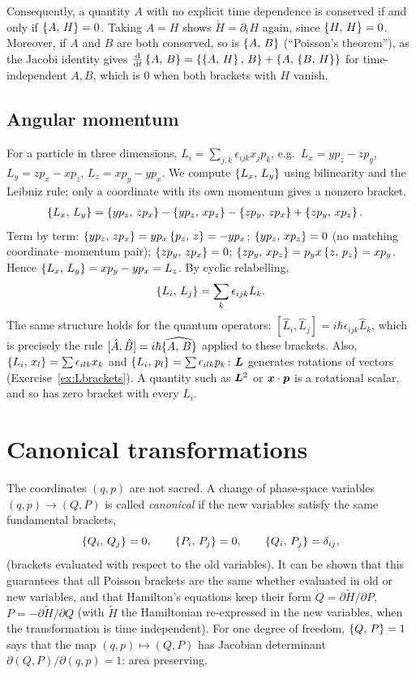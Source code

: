\documentclass[11pt]{article}
\begin{document}
Consequently, a quantity $A$ with no explicit time dependence is conserved if and only if $\left\{A,\,H\right\}=0$. Taking $A=H$ shows $\dot H=\partial_tH$ again, since $\left\{H,\,H\right\}=0$. Moreover, if $A$ and $B$ are both conserved, so is $\left\{A,\,B\right\}$ (``Poisson's theorem''), as the Jacobi identity gives $\frac{\mathrm{d} }{\mathrm{d} t}\left\{A,\,B\right\}=\left\{\left\{A,\,H\right\},\,B\right\}+\left\{A,\,\left\{B,\,H\right\}\right\}$ for time-independent $A,B$, which is $0$ when both brackets with $H$ vanish.

\subsection{Angular momentum}

For a particle in three dimensions, $L_i=\sum_{j,k}\epsilon_{ijk}x_jp_k$, e.g.\ $L_x=yp_z-zp_y$, $L_y=zp_x-xp_z$, $L_z=xp_y-yp_x$. We compute $\left\{L_x,\,L_y\right\}$ using bilinearity and the Leibniz rule; only a coordinate with its own momentum gives a nonzero bracket.
\begin{align}
 \left\{L_x,\,L_y\right\}&=\left\{yp_z,\,zp_x\right\}-\left\{yp_z,\,xp_z\right\}-\left\{zp_y,\,zp_x\right\}+\left\{zp_y,\,xp_z\right\}.
\end{align}
Term by term: $\left\{yp_z,\,zp_x\right\}=yp_x\left\{p_z,\,z\right\}=-yp_x$; $\left\{yp_z,\,xp_z\right\}=0$ (no matching coordinate--momentum pair); $\left\{zp_y,\,zp_x\right\}=0$; $\left\{zp_y,\,xp_z\right\}=p_yx\left\{z,\,p_z\right\}=xp_y$. Hence $\left\{L_x,\,L_y\right\}=xp_y-yp_x=L_z$. By cyclic relabelling,
\begin{equation}
 \left\{L_i,\,L_j\right\}=\sum_k\epsilon_{ijk}L_k .
\end{equation}
The same structure holds for the quantum operators: $[\hat L_i,\hat L_j]=i\hbar\epsilon_{ijk}\hat L_k$, which is precisely the rule $[\hat A,\hat B]=i\hbar\widehat{\left\{A,\,B\right\}}$ applied to these brackets. Also, $\left\{L_i,\,x_l\right\}=\sum\epsilon_{ilk}x_k$ and $\left\{L_i,\,p_l\right\}=\sum\epsilon_{ilk}p_k$: $\bm{L}$ generates rotations of vectors (Exercise~\ref{ex:Lbrackets}). A quantity such as $\bm{L}^2$ or $\bm{x}\cdot\bm{p}$ is a rotational scalar, and so has zero bracket with every $L_i$.

\section{Canonical transformations}

The coordinates $(q,p)$ are not sacred. A change of phase-space variables $(q,p)\to(Q,P)$ is called \emph{canonical} if the new variables satisfy the same fundamental brackets,
\begin{equation}
 \left\{Q_i,\,Q_j\right\}=0,\qquad\left\{P_i,\,P_j\right\}=0,\qquad\left\{Q_i,\,P_j\right\}=\delta_{ij},
\end{equation}
(brackets evaluated with respect to the old variables). It can be shown that this guarantees that all Poisson brackets are the same whether evaluated in old or new variables, and that Hamilton's equations keep their form $\dot Q=\partial\tilde H/\partial P$, $\dot P=-\partial\tilde H/\partial Q$ (with $\tilde H$ the Hamiltonian re-expressed in the new variables, when the transformation is time independent). For one degree of freedom, $\left\{Q,\,P\right\}=1$ says that the map $(q,p)\mapsto(Q,P)$ has Jacobian determinant $\partial(Q,P)/\partial(q,p)=1$: area preserving.
\end{document}
